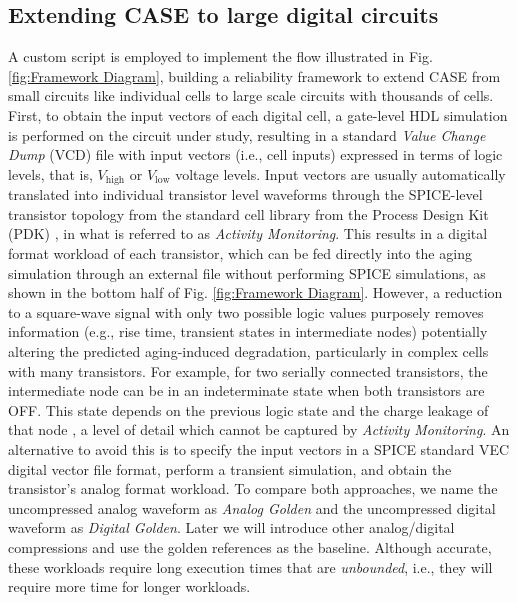 \subsection{Extending CASE to large digital circuits}
\label{ss:ExtendingCASE}
 A custom script is employed to implement the flow illustrated in Fig. \ref{fig:Framework Diagram}, building a reliability framework to extend CASE from small circuits like individual cells to large scale circuits with thousands of cells. First, to obtain the input vectors of each digital cell, a gate-level HDL simulation is performed on the circuit under study, resulting in a standard \textit{Value Change Dump} (VCD) file with input vectors (i.e., cell inputs) expressed in terms of logic levels, that is, $V_{\text{high}}$ or $V_{\text{low}}$ voltage levels. Input vectors are usually automatically translated into individual transistor level waveforms through the SPICE-level transistor topology from the standard cell library from the Process Design Kit (PDK) \cite{vansantenDesigningGuardbandsInstantaneous2016, duchAnalysisFunctionalErrors2020, fornaciariHarnessingPerformanceVariability2019}, in what is referred to as \textit{Activity Monitoring}. This results in a digital format workload of each transistor, which can be fed directly into the aging simulation through an external file without performing SPICE simulations, as shown in the bottom half of Fig. \ref{fig:Framework Diagram}. However, a reduction to a square-wave signal with only two possible logic values purposely removes information (e.g., rise time, transient states in intermediate nodes) potentially altering the predicted aging-induced degradation, particularly in complex cells with many transistors. For example, for two serially connected transistors, the intermediate node can be in an indeterminate state when both transistors are OFF. This state depends on the previous logic state and the charge leakage of that node \cite{zhangAgingAwareGateLevelModeling2021}, a level of detail which cannot be captured by \textit{Activity Monitoring}. An alternative to avoid this is to specify the input vectors in a SPICE standard VEC digital vector file format, perform a transient simulation, and obtain the transistor’s analog format workload. To compare both approaches, we name the uncompressed analog waveform as \textit{Analog Golden} and the uncompressed digital waveform as \textit{Digital Golden}. Later we will introduce other analog/digital compressions and use the golden references as the baseline. Although accurate, these workloads require long execution times that are \textit{unbounded}, i.e., they will require more time for longer workloads.

